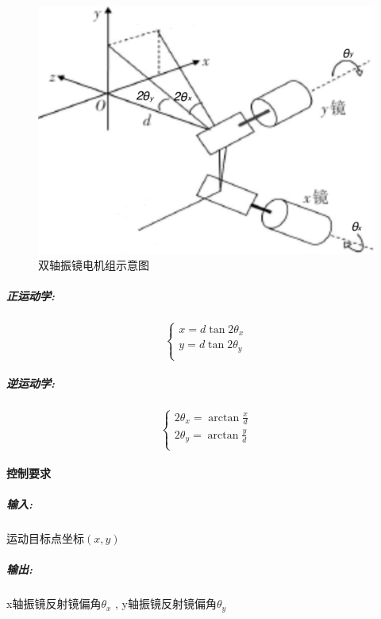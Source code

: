 \documentclass[a4paper,12pt,onecolumn,twoside]{article}
\begin{document}
\begin{figure}[htbp]
\includegraphics[width=1\linewidth]{MG4.png}
\caption{双轴振镜电机组示意图}
\end{figure}

\subparagraph{正运动学:}
\begin{equation}
\left\{
\begin{array}{c}
x=d\tan2\theta_x \\
y=d\tan2\theta_y\\ 
\end{array}
\right.
\end{equation}
\subparagraph{逆运动学:}
\begin{equation}
\left\{
\begin{array}{l}
2\theta_x = \arctan\frac{x}{d}  \\
2\theta_y = \arctan\frac{y}{d} \\
\end{array}
\right.
\end{equation}
 \paragraph{控制要求}
\subparagraph{输入:}
运动目标点坐标$(x,y)$
\subparagraph{输出:}
x轴振镜反射镜偏角$\theta_x$ , y轴振镜反射镜偏角$\theta_y$
\end{document}
